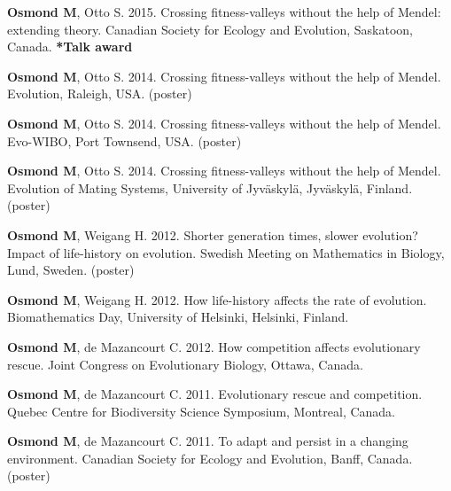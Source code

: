 \documentclass[12pt]{article}
\begin{document}
\textbf{Osmond M}, Otto S. 2015. Crossing fitness-valleys without the help of Mendel: extending theory. Canadian Society for Ecology and Evolution, Saskatoon, Canada. \textbf{*Talk award}


\textbf{Osmond M}, Otto S. 2014. Crossing fitness-valleys without the help of Mendel. Evolution, Raleigh, USA. (poster)

\textbf{Osmond M}, Otto S. 2014. Crossing fitness-valleys without the help of Mendel. Evo-WIBO, Port Townsend, USA. (poster)


\textbf{Osmond M}, Otto S. 2014. Crossing fitness-valleys without the help of Mendel. Evolution of Mating Systems, University of Jyv\"askyl\"a, Jyv\"askyl\"a, Finland. (poster)


\textbf{Osmond M}, Weigang H. 2012. Shorter generation times, slower evolution? Impact of life-history on evolution. Swedish Meeting on Mathematics in Biology, Lund, Sweden. (poster)

\textbf{Osmond M}, Weigang H. 2012. How life-history affects the rate of evolution. Biomathematics Day, University of Helsinki, Helsinki, Finland.

\textbf{Osmond M}, de Mazancourt C. 2012. How competition affects evolutionary rescue. Joint Congress on Evolutionary Biology, Ottawa, Canada.

\textbf{Osmond M}, de Mazancourt C. 2011. Evolutionary rescue and competition. Quebec Centre for Biodiversity Science Symposium, Montreal, Canada.

\textbf{Osmond M}, de Mazancourt C. 2011. To adapt and persist in a changing environment. Canadian Society for Ecology and Evolution, Banff, Canada. (poster)

\end{document}
